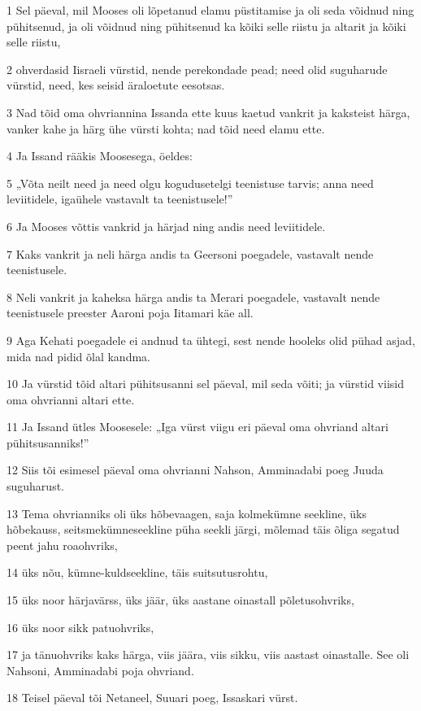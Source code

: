 \par 1 Sel päeval, mil Mooses oli lõpetanud elamu püstitamise ja oli seda võidnud ning pühitsenud, ja oli võidnud ning pühitsenud ka kõiki selle riistu ja altarit ja kõiki selle riistu,
\par 2 ohverdasid Iisraeli vürstid, nende perekondade pead; need olid suguharude vürstid, need, kes seisid äraloetute eesotsas.
\par 3 Nad tõid oma ohvriannina Issanda ette kuus kaetud vankrit ja kaksteist härga, vanker kahe ja härg ühe vürsti kohta; nad tõid need elamu ette.
\par 4 Ja Issand rääkis Moosesega, öeldes:
\par 5 „Võta neilt need ja need olgu kogudusetelgi teenistuse tarvis; anna need leviitidele, igaühele vastavalt ta teenistusele!”
\par 6 Ja Mooses võttis vankrid ja härjad ning andis need leviitidele.
\par 7 Kaks vankrit ja neli härga andis ta Geersoni poegadele, vastavalt nende teenistusele.
\par 8 Neli vankrit ja kaheksa härga andis ta Merari poegadele, vastavalt nende teenistusele preester Aaroni poja Iitamari käe all.
\par 9 Aga Kehati poegadele ei andnud ta ühtegi, sest nende hooleks olid pühad asjad, mida nad pidid õlal kandma.
\par 10 Ja vürstid tõid altari pühitsusanni sel päeval, mil seda võiti; ja vürstid viisid oma ohvrianni altari ette.
\par 11 Ja Issand ütles Moosesele: „Iga vürst viigu eri päeval oma ohvriand altari pühitsusanniks!”
\par 12 Siis tõi esimesel päeval oma ohvrianni Nahson, Amminadabi poeg Juuda suguharust.
\par 13 Tema ohvrianniks oli üks hõbevaagen, saja kolmekümne seekline, üks hõbekauss, seitsmekümneseekline püha seekli järgi, mõlemad täis õliga segatud peent jahu roaohvriks,
\par 14 üks nõu, kümne-kuldseekline, täis suitsutusrohtu,
\par 15 üks noor härjavärss, üks jäär, üks aastane oinastall põletusohvriks,
\par 16 üks noor sikk patuohvriks,
\par 17 ja tänuohvriks kaks härga, viis jäära, viis sikku, viis aastast oinastalle. See oli Nahsoni, Amminadabi poja ohvriand.
\par 18 Teisel päeval tõi Netaneel, Suuari poeg, Issaskari vürst.

